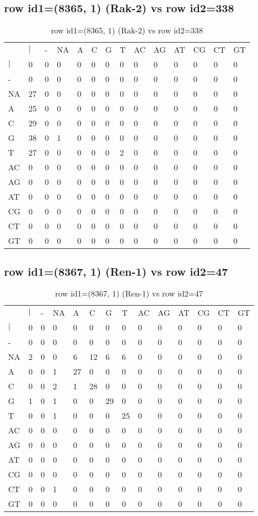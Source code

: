 \subsection{row id1=(8365, 1) (Rak-2) vs row id2=338}
\begin{center}
\begin{longtable}{|l|l|l|l|l|l|l|l|l|l|l|l|l|l|}
\caption{row id1=(8365, 1) (Rak-2) vs row id2=338} \label{table_dm402}\\
\hline
\\
\hline
&$|$&-&NA&A&C&G&T&AC&AG&AT&CG&CT&GT\\
$|$&0&0&0&0&0&0&0&0&0&0&0&0&0\\
-&0&0&0&0&0&0&0&0&0&0&0&0&0\\
NA&27&0&0&0&0&0&0&0&0&0&0&0&0\\
A&25&0&0&0&0&0&0&0&0&0&0&0&0\\
C&29&0&0&0&0&0&0&0&0&0&0&0&0\\
G&38&0&1&0&0&0&0&0&0&0&0&0&0\\
T&27&0&0&0&0&0&2&0&0&0&0&0&0\\
AC&0&0&0&0&0&0&0&0&0&0&0&0&0\\
AG&0&0&0&0&0&0&0&0&0&0&0&0&0\\
AT&0&0&0&0&0&0&0&0&0&0&0&0&0\\
CG&0&0&0&0&0&0&0&0&0&0&0&0&0\\
CT&0&0&0&0&0&0&0&0&0&0&0&0&0\\
GT&0&0&0&0&0&0&0&0&0&0&0&0&0\\
\hline
\end{longtable}
\end{center}

\subsection{row id1=(8367, 1) (Ren-1) vs row id2=47}
\begin{center}
\begin{longtable}{|l|l|l|l|l|l|l|l|l|l|l|l|l|l|}
\caption{row id1=(8367, 1) (Ren-1) vs row id2=47} \label{table_dm404}\\
\hline
\\
\hline
&$|$&-&NA&A&C&G&T&AC&AG&AT&CG&CT&GT\\
$|$&0&0&0&0&0&0&0&0&0&0&0&0&0\\
-&0&0&0&0&0&0&0&0&0&0&0&0&0\\
NA&2&0&0&6&12&6&6&0&0&0&0&0&0\\
A&0&0&1&27&0&0&0&0&0&0&0&0&0\\
C&0&0&2&1&28&0&0&0&0&0&0&0&0\\
G&1&0&1&0&0&29&0&0&0&0&0&0&0\\
T&0&0&1&0&0&0&25&0&0&0&0&0&0\\
AC&0&0&0&0&0&0&0&0&0&0&0&0&0\\
AG&0&0&0&0&0&0&0&0&0&0&0&0&0\\
AT&0&0&0&0&0&0&0&0&0&0&0&0&0\\
CG&0&0&0&0&0&0&0&0&0&0&0&0&0\\
CT&0&0&1&0&0&0&0&0&0&0&0&0&0\\
GT&0&0&0&0&0&0&0&0&0&0&0&0&0\\
\hline
\end{longtable}
\end{center}

